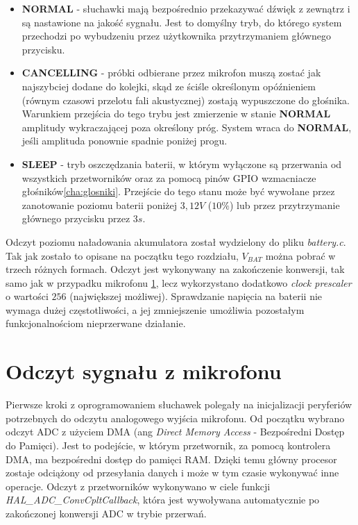 \begin{itemize}
	\item \textbf{NORMAL} - słuchawki mają bezpośrednio przekazywać dźwięk z zewnątrz i są nastawione na jakość sygnału. Jest to domyślny tryb, do którego system przechodzi po wybudzeniu przez użytkownika przytrzymaniem głównego przycisku.
	
	\item \textbf{CANCELLING} - próbki odbierane przez mikrofon muszą zostać jak najszybciej dodane do kolejki, skąd ze ściśle określonym opóźnieniem (równym czasowi przelotu fali akustycznej) zostają wypuszczone do głośnika. Warunkiem przejścia do tego trybu jest zmierzenie w stanie \textbf{NORMAL} amplitudy wykraczającej poza określony próg. System wraca do \textbf{NORMAL}, jeśli amplituda ponownie spadnie poniżej progu.
	
	\item \textbf{SLEEP} - tryb oszczędzania baterii, w którym wyłączone są przerwania od wszystkich przetworników oraz za pomocą pinów GPIO wzmacniacze głośników\ref{cha:glosniki}. Przejście do tego stanu może być wywołane przez zanotowanie poziomu baterii poniżej $3,12V$ ($10\%$) lub przez przytrzymanie głównego przycisku przez $3s$.
\end{itemize}

Odczyt poziomu naładowania akumulatora został wydzielony do pliku \textit{battery.c}. Tak jak zostało to opisane na początku tego rozdziału, $V_{BAT}$ można pobrać w trzech różnych formach. Odczyt jest wykonywany na zakończenie konwersji, tak samo jak w przypadku mikrofonu \ref{cha:soft_mic}, lecz wykorzystano dodatkowo \textit{clock prescaler} o wartości $256$ (największej możliwej). Sprawdzanie napięcia na baterii nie wymaga dużej częstotliwości, a jej zmniejszenie umożliwia pozostałym funkcjonalnościom nieprzerwane działanie.

\section{Odczyt sygnału z mikrofonu}
\label{cha:soft_mic}

Pierwsze kroki z oprogramowaniem słuchawek polegały na inicjalizacji peryferiów potrzebnych do odczytu analogowego wyjścia mikrofonu. Od początku wybrano odczyt ADC z użyciem DMA (ang \textit{Direct Memory Access} - Bezpośredni Dostęp do Pamięci). Jest to podejście, w którym przetwornik, za pomocą kontrolera DMA, ma bezpośredni dostęp do pamięci RAM. Dzięki temu główny procesor zostaje odciążony od przesyłania danych i może w tym czasie wykonywać inne operacje. Odczyt z przetworników wykonywano w ciele funkcji \textit{HAL\_ADC\_ConvCpltCallback}, która jest wywoływana automatycznie po zakończonej konwersji ADC w trybie przerwań.

